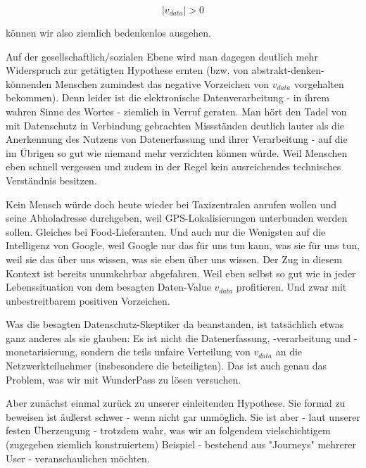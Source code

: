\begin{equation*}
\vert v_{data} \vert > 0
\end{equation*}

können wir also ziemlich bedenkenlos ausgehen.

\vspace{0.2cm}

Auf der gesellschaftlich/sozialen Ebene wird man dagegen deutlich mehr Widerspruch zur getätigten Hypothese ernten (bzw. von abstrakt-denken-könnenden Menschen zumindest das negative Vorzeichen von $v_{data}$ vorgehalten bekommen). Denn leider ist die elektronische Datenverarbeitung - in ihrem wahren Sinne des Wortes - ziemlich in Verruf geraten. Man hört den Tadel von mit Datenschutz in Verbindung gebrachten Missständen deutlich lauter als die Anerkennung des Nutzens von Datenerfassung und ihrer Verarbeitung - auf die im Übrigen so gut wie niemand mehr verzichten können würde. Weil Menschen eben schnell vergessen und zudem in der Regel kein ausreichendes technisches Verständnis besitzen. 

Kein Mensch würde doch heute wieder bei Taxizentralen anrufen wollen und seine Abholadresse durchgeben, weil GPS-Lokalisierungen unterbunden werden sollen. Gleiches bei Food-Lieferanten. Und auch nur die Wenigsten auf die Intelligenz von Google, weil Google nur das für uns tun kann, was sie für uns tun, weil sie das über uns wissen, was sie eben über uns wissen. Der Zug in diesem Kontext ist bereits unumkehrbar abgefahren. Weil eben selbst so gut wie in jeder Lebenssituation von dem besagten Daten-Value $v_{data}$ profitieren. Und zwar mit unbestreitbarem positiven Vorzeichen.

Was die besagten Datenschutz-Skeptiker da beanstanden, ist tatsächlich etwas ganz anderes als sie glauben: Es ist nicht die Datenerfassung, -verarbeitung und -monetarisierung, sondern die teils unfaire Verteilung von $v_{data}$ an die Netzwerkteilnehmer (insbesondere die beteiligten). Das ist auch genau das Problem, was wir mit WunderPass zu lösen versuchen.

\vspace{0.2cm}

Aber zunächst einmal zurück zu unserer einleitenden Hypothese. Sie formal zu beweisen ist äußerst schwer - wenn nicht gar unmöglich. Sie ist aber - laut unserer festen Überzeugung - trotzdem wahr, was wir an folgendem vielschichtigem (zugegeben ziemlich konstruiertem) Beispiel - bestehend aus "Journeys" mehrerer User - veranschaulichen möchten.

